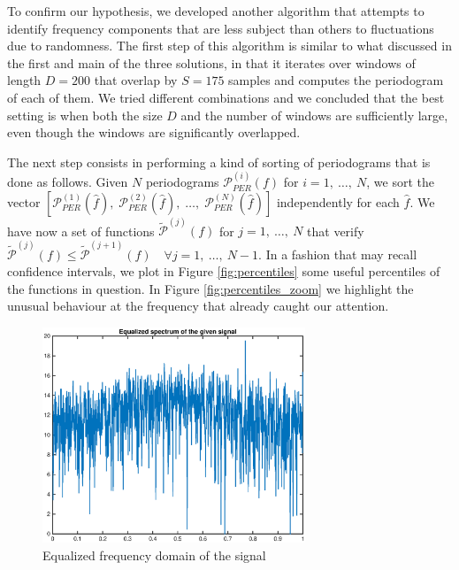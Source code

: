 \documentclass[10pt]{article}
\numberwithin{equation}{section}
\begin{document}
To confirm our hypothesis, we developed another algorithm that attempts to identify frequency components that are less subject than others to fluctuations due to randomness. The first step of this algorithm is similar to what discussed in the first and main of the three solutions, in that it iterates over windows of length $D = 200$ that overlap by $S = 175$ samples and computes the periodogram of each of them. We tried different combinations and we concluded that the best setting is when both the size $D$ and the number of windows are sufficiently large, even though the windows are significantly overlapped.

The next step consists in performing a kind of sorting of periodograms that is done as follows. Given $N$ periodograms $\mathcal{P}_{PER}^{(i)} (f)$ for $i=1,~\ldots,~N$, we sort the vector $[ \mathcal{P}_{PER}^{(1)}(\hat{f}), \; \mathcal{P}_{PER}^{(2)}(\hat{f}), \; \ldots, \; \mathcal{P}_{PER}^{(N)}(\hat{f}) ]$ independently for each $\hat{f}$. We have now a set of functions $\mathcal{\tilde{P}}^{(j)}(f)$ for $j = 1,~\ldots,~N$ that verify $\mathcal{\tilde{P}}^{(j)}(f) \leq \mathcal{\tilde{P}}^{(j+1)}(f) \quad \forall j = 1,~\ldots,~N-1$. In a fashion that may recall confidence intervals, we plot in Figure \ref{fig:percentiles} some useful percentiles of the functions in question. In Figure \ref{fig:percentiles_zoom} we highlight the unusual behaviour at the frequency that already caught our attention.

\begin{figure}[h!]
 \centering
 \includegraphics[width = 0.7\textwidth]{images/whitening}
 \caption{Equalized frequency domain of the signal}
 \label{fig:whitening}
\end{figure}
\end{document}
